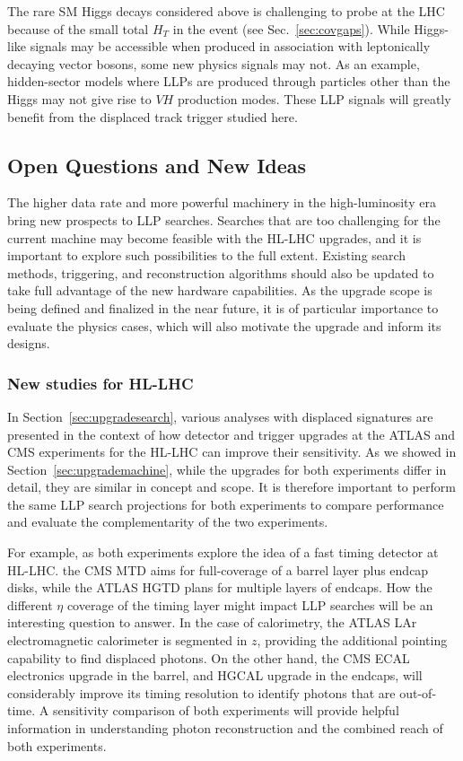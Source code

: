 The rare SM Higgs decays considered above is challenging to probe at the LHC because of the small total $H_T$ in the event (see Sec.~\ref{sec:covgaps}). 
While Higgs-like signals may be accessible when produced in association with leptonically decaying vector bosons, some new physics signals may not. As an example, hidden-sector models where LLPs are produced through particles other than the Higgs may not give rise to $VH$ production modes.
These LLP signals will greatly benefit from the displaced track trigger studied here.

\subsection{Open Questions and New Ideas}\label{sec:upgradeideas}


The higher data rate and more powerful machinery in the high-luminosity era bring new prospects to LLP searches. 
Searches that are too challenging for the current machine may become feasible with the HL-LHC upgrades, and it is important to explore such possibilities to the full extent. 
Existing search methods, triggering, and reconstruction algorithms should also be updated to take full advantage of the new hardware capabilities. 
As the upgrade scope is being defined and finalized in the near future, it is of particular importance to evaluate the physics cases, which will also motivate the upgrade and inform its designs. 

\subsubsection{New studies  for HL-LHC}

In Section~\ref{sec:upgradesearch}, various analyses with displaced signatures are presented in the context of how detector and trigger upgrades at the ATLAS and CMS experiments for the HL-LHC can improve their sensitivity. 
As we showed in Section~\ref{sec:upgrademachine}, while the upgrades for both experiments differ in detail, they are similar in concept and scope. 
It is therefore important to perform the same LLP search projections for both experiments to compare performance and evaluate the complementarity of the two experiments. 

For example, as both experiments explore the idea of a fast timing detector at HL-LHC. the CMS MTD aims for full-coverage of a barrel layer plus endcap disks, while the ATLAS HGTD plans for multiple layers of endcaps. 
How the different $\eta$ coverage of the timing layer might impact LLP searches will be an interesting question to answer. 
In the case of calorimetry, the ATLAS LAr electromagnetic calorimeter is segmented in $z$, providing the additional pointing capability to find displaced photons. 
On the other hand, the CMS ECAL electronics upgrade in the barrel, and HGCAL upgrade in the endcaps, will considerably improve its timing resolution to identify photons that are out-of-time. 
A sensitivity comparison of both experiments will provide helpful information in understanding photon reconstruction and the combined reach of both experiments. 


